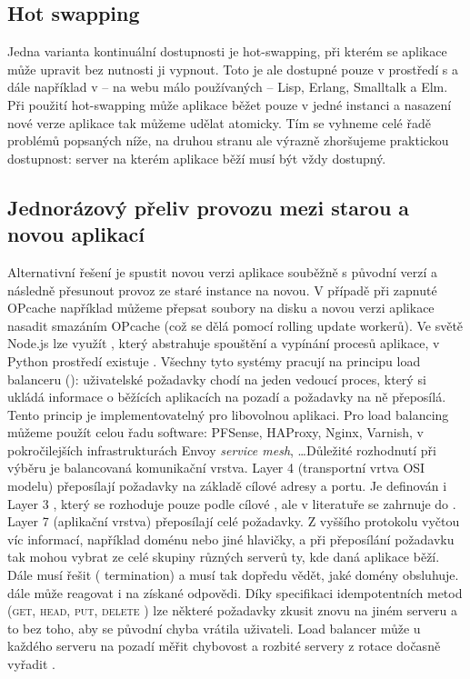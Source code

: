         \subsection{Hot swapping}
            Jedna varianta kontinuální dostupnosti je hot-swapping, při kterém se aplikace může upravit bez nutnosti ji vypnout. Toto je ale dostupné pouze v prostředí s  a dále například v -- na webu málo používaných -- Lisp, Erlang, Smalltalk a Elm. Při použití hot-swapping může aplikace běžet pouze v jedné instanci a nasazení nové verze aplikace tak můžeme udělat atomicky. Tím se vyhneme celé řadě problémů popsaných níže, na druhou stranu ale výrazně zhoršujeme praktickou dostupnost: server na kterém aplikace běží musí být vždy dostupný.

        \subsection{Jednorázový přeliv provozu mezi starou a novou aplikací}
            \label{deploy-v-jedne-instanci}
            Alternativní řešení je spustit novou verzi aplikace souběžně s původní verzí a následně přesunout provoz ze staré instance na novou. V případě  při zapnuté OPcache například můžeme přepsat soubory na disku a novou verzi aplikace nasadit smazáním OPcache (což se dělá pomocí rolling update  workerů). Ve světě Node.js lze využít , který abstrahuje spouštění a vypínání procesů aplikace, v Python prostředí existuje . Všechny tyto systémy pracují na principu load balanceru (): uživatelské požadavky chodí na jeden vedoucí proces, který si ukládá informace o běžících aplikacích na pozadí a požadavky na ně přeposílá. Tento princip je implementovatelný pro libovolnou aplikaci. Pro load balancing můžeme použít celou řadu software: PFSense, HAProxy, Nginx, Varnish, v pokročilejších infrastrukturách Envoy \textit{service mesh}, \ldots Důležité rozhodnutí při výběru  je balancovaná komunikační vrstva. Layer 4 (transportní vrtva OSI modelu)  přeposílají  požadavky na základě cílové  adresy a portu. Je definován i Layer 3 , který se rozhoduje pouze podle cílové , ale v literatuře se zahrnuje do . Layer 7 (aplikační vrstva)  přeposílají celé \HTTP požadavky. Z vyššího protokolu vyčtou víc informací, například doménu nebo jiné hlavičky, a při přeposílání požadavku tak mohou vybrat ze celé skupiny různých serverů ty, kde daná aplikace běží. Dále   musí řešit  ( termination) a musí tak dopředu vědět, jaké domény obsluhuje.   dále může reagovat i na získané \HTTP odpovědi. Díky \HTTP specifikaci idempotentních metod (\textsc{get}, \textsc{head}, \textsc{put}, \textsc{delete} \cite{http-idempotent}) lze některé požadavky zkusit znovu na jiném serveru a to bez toho, aby se původní chyba vrátila uživateli. Load balancer může u každého serveru na pozadí měřit chybovost a rozbité servery z rotace dočasně vyřadit \cite{nginx-circuit-breaker}.

